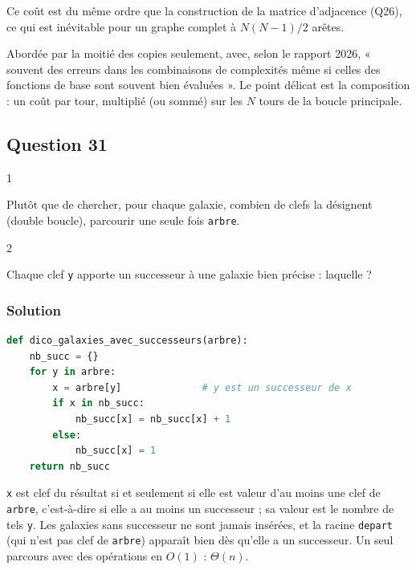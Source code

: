 \documentclass[11pt,a4paper]{article}
\newcommand{\equationajustee}[1]{%
  \sbox{\boiteequation}{$\displaystyle #1$}%
  \ifdim\wd\boiteequation>\linewidth
    \[\resizebox{\linewidth}{!}{\usebox{\boiteequation}}\]%
  \else
    \[#1\]%
  \fi}
\begin{document}
\equationajustee{\boxed{C(N) = O(N^2) \text{ dans le pire des cas}}}

Ce coût est du même ordre que la construction de la matrice d'adjacence (Q26), ce qui est inévitable pour un graphe complet à \(N(N-1)/2\) arêtes.

\begin{jury}

Abordée par la moitié des copies seulement, avec, selon le rapport 2026, « souvent des erreurs dans les combinaisons de complexités même si celles des fonctions de base sont souvent bien évaluées ». Le point délicat est la composition : un coût par tour, multiplié (ou sommé) sur les \(N\) tours de la boucle principale.

\end{jury}

\hypertarget{question-31}{%
\subsection{Question 31}\label{question-31}}

\begin{indication}{1}

Plutôt que de chercher, pour chaque galaxie, combien de clefs la désignent (double boucle), parcourir une seule fois \texttt{arbre}.

\end{indication}

\begin{indication}{2}

Chaque clef \texttt{y} apporte un successeur à une galaxie bien précise : laquelle ?

\end{indication}

\hypertarget{solution-30}{%
\subsubsection{Solution}\label{solution-30}}

\begin{lstlisting}[language=Python]
def dico_galaxies_avec_successeurs(arbre):
    nb_succ = {}
    for y in arbre:
        x = arbre[y]              # y est un successeur de x
        if x in nb_succ:
            nb_succ[x] = nb_succ[x] + 1
        else:
            nb_succ[x] = 1
    return nb_succ
\end{lstlisting}

\texttt{x} est clef du résultat si et seulement si elle est valeur d'au moins une clef de \texttt{arbre}, c'est-à-dire si elle a au moins un successeur ; sa valeur est le nombre de tels \texttt{y}. Les galaxies sans successeur ne sont jamais insérées, et la racine \texttt{depart} (qui n'est pas clef de \texttt{arbre}) apparaît bien dès qu'elle a un successeur. Un seul parcours avec des opérations en \(O(1)\) : \(\Theta(n)\).
\end{document}

